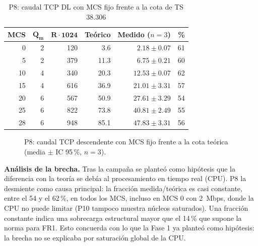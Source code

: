 \documentclass[conference]{IEEEtran}
\begin{document}
\begin{table}[!t]
\caption{P8: caudal TCP DL con MCS fijo frente a la cota de TS 38.306}
\label{tab:p8}
\centering
\footnotesize
\renewcommand{\arraystretch}{1.12}
\begin{tabular}{rrrrrr}
\toprule
\textbf{MCS} & $\mathbf{Q_m}$ & $\mathbf{R\cdot1024}$ & \textbf{Teórico} & \textbf{Medido ($n=3$)} & \textbf{\%} \\
\midrule
0 & 2 & 120 & 3.6 & $2.18\pm0.07$ & 61 \\
5 & 2 & 379 & 11.3 & $6.75\pm0.21$ & 60 \\
10 & 4 & 340 & 20.3 & $12.53\pm0.07$ & 62 \\
15 & 4 & 616 & 36.9 & $21.01\pm3.31$ & 57 \\
20 & 6 & 567 & 50.9 & $27.61\pm3.29$ & 54 \\
25 & 6 & 822 & 73.8 & $40.81\pm2.49$ & 55 \\
28 & 6 & 948 & 85.1 & $47.83\pm3.31$ & 56 \\
\bottomrule
\end{tabular}
\end{table}

\begin{figure}[!t]
\centering
{}
\caption{P8: caudal TCP descendente con MCS fijo frente a la cota teórica (media $\pm$ IC 95\,\%, $n=3$).}
\label{fig:p8}
\end{figure}

\textbf{Análisis de la brecha.} Tras la campaña se planteó como hipótesis que la diferencia con la teoría se debía al procesamiento en tiempo real (CPU). P8 la desmiente como causa principal: la fracción medida/teórica es casi constante, entre el 54 y el 62\,\%, en todos los MCS, incluso en MCS 0 con 2~Mbps, donde la CPU no puede limitar (P10 tampoco muestra núcleos saturados). Una fracción constante indica una sobrecarga estructural mayor que el 14\,\% que supone la norma para FR1. Esto concuerda con lo que la Fase 1 ya planteó como hipótesis: la brecha no se explicaba por saturación global de la CPU.
\end{document}
